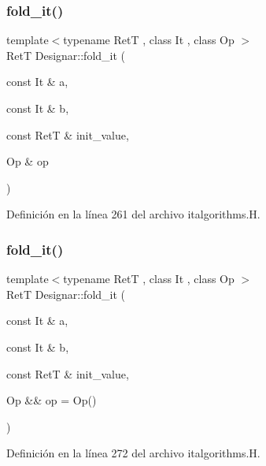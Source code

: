 \subsubsection{\texorpdfstring{fold\+\_\+it()}{fold\_it()}\hspace{0.1cm}{\footnotesize\ttfamily [1/4]}}
{\footnotesize\ttfamily template$<$typename RetT , class It , class Op $>$ \\
RetT Designar\+::fold\+\_\+it (\begin{DoxyParamCaption}\item[{const It \&}]{a,  }\item[{const It \&}]{b,  }\item[{const RetT \&}]{init\+\_\+value,  }\item[{Op \&}]{op }\end{DoxyParamCaption})}



Definición en la línea 261 del archivo italgorithms.\+H.

\mbox{\label{namespace_designar_a412ed1014bc60b2db6211871855ccba9}} 
\subsubsection{\texorpdfstring{fold\+\_\+it()}{fold\_it()}\hspace{0.1cm}{\footnotesize\ttfamily [2/4]}}
{\footnotesize\ttfamily template$<$typename RetT , class It , class Op $>$ \\
RetT Designar\+::fold\+\_\+it (\begin{DoxyParamCaption}\item[{const It \&}]{a,  }\item[{const It \&}]{b,  }\item[{const RetT \&}]{init\+\_\+value,  }\item[{Op \&\&}]{op = {\ttfamily Op()} }\end{DoxyParamCaption})}



Definición en la línea 272 del archivo italgorithms.\+H.

\mbox{\label{namespace_designar_a034ad070a0aac24d53fd1c4612d2c58c}} 
